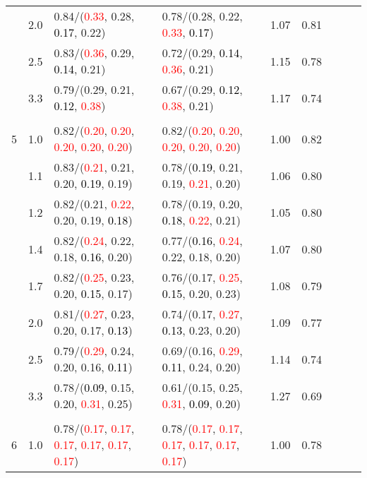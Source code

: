 \documentclass[10pt,a4paper]{report}
\begin{document}
\begin{table}[!htbp]
\begin{center}
{\begin{tabular}{ccllccccc}
			&2.0&0.84/(\textcolor{red}{0.33}, 0.28, \textcolor{black}{0.17}, 0.22)&0.78/(0.28, 0.22, \textcolor{red}{0.33}, \textcolor{black}{0.17})&1.07&0.81\\
			&2.5&0.83/(\textcolor{red}{0.36}, 0.29, \textcolor{black}{0.14}, 0.21)&0.72/(0.29, \textcolor{black}{0.14}, \textcolor{red}{0.36}, 0.21)&1.15&0.78\\
			&3.3&0.79/(0.29, 0.21, \textcolor{black}{0.12}, \textcolor{red}{0.38})&0.67/(0.29, \textcolor{black}{0.12}, \textcolor{red}{0.38}, 0.21)&1.17&0.74\\
			&&&&\\
			5			&1.0&0.82/(\textcolor{red}{0.20}, \textcolor{red}{0.20}, \textcolor{red}{0.20}, \textcolor{red}{0.20}, \textcolor{red}{0.20})&0.82/(\textcolor{red}{0.20}, \textcolor{red}{0.20}, \textcolor{red}{0.20}, \textcolor{red}{0.20}, \textcolor{red}{0.20})&1.00&0.82\\
			&1.1&0.83/(\textcolor{red}{0.21}, 0.21, 0.20, \textcolor{black}{0.19}, 0.19)&0.78/(\textcolor{black}{0.19}, 0.21, 0.19, \textcolor{red}{0.21}, 0.20)&1.06&0.80\\
			&1.2&0.82/(0.21, \textcolor{red}{0.22}, 0.20, 0.19, \textcolor{black}{0.18})&0.78/(0.19, 0.20, \textcolor{black}{0.18}, \textcolor{red}{0.22}, 0.21)&1.05&0.80\\
			&1.4&0.82/(\textcolor{red}{0.24}, 0.22, 0.18, \textcolor{black}{0.16}, 0.20)&0.77/(\textcolor{black}{0.16}, \textcolor{red}{0.24}, 0.22, 0.18, 0.20)&1.07&0.80\\
			&1.7&0.82/(\textcolor{red}{0.25}, 0.23, 0.20, \textcolor{black}{0.15}, 0.17)&0.76/(0.17, \textcolor{red}{0.25}, \textcolor{black}{0.15}, 0.20, 0.23)&1.08&0.79\\
			&2.0&0.81/(\textcolor{red}{0.27}, 0.23, 0.20, 0.17, \textcolor{black}{0.13})&0.74/(0.17, \textcolor{red}{0.27}, \textcolor{black}{0.13}, 0.23, 0.20)&1.09&0.77\\
			&2.5&0.79/(\textcolor{red}{0.29}, 0.24, 0.20, 0.16, \textcolor{black}{0.11})&0.69/(0.16, \textcolor{red}{0.29}, \textcolor{black}{0.11}, 0.24, 0.20)&1.14&0.74\\
			&3.3&0.78/(\textcolor{black}{0.09}, 0.15, 0.20, \textcolor{red}{0.31}, 0.25)&0.61/(0.15, 0.25, \textcolor{red}{0.31}, \textcolor{black}{0.09}, 0.20)&1.27&0.69\\
			&&&&\\
			6			&1.0&0.78/(\textcolor{red}{0.17}, \textcolor{red}{0.17}, \textcolor{red}{0.17}, \textcolor{red}{0.17}, \textcolor{red}{0.17}, \textcolor{red}{0.17})&0.78/(\textcolor{red}{0.17}, \textcolor{red}{0.17}, \textcolor{red}{0.17}, \textcolor{red}{0.17}, \textcolor{red}{0.17}, \textcolor{red}{0.17})&1.00&0.78\\

\end{tabular}}
\end{center}
\end{table}
\end{document}
